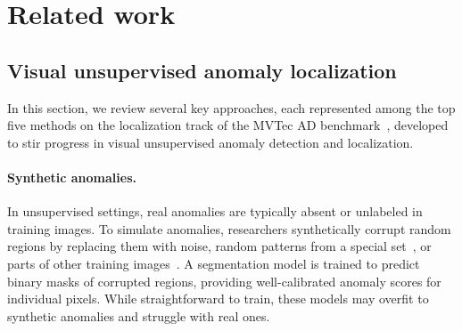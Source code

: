 
\section{Related work}
\label{sec:related_work}

\subsection{Visual unsupervised anomaly localization}

In this section, we review several key approaches, each represented among the top five methods on the localization track of the MVTec AD benchmark~\cite{mvtec}, developed to stir progress in visual unsupervised anomaly detection and localization. 

\paragraph{Synthetic anomalies.} In unsupervised settings, real anomalies are typically absent or unlabeled in training images. To simulate anomalies, researchers synthetically corrupt random regions by replacing them with noise, random patterns from a special set~\cite{memseg}, or parts of other training images~\cite{mood_top1}. A segmentation model is trained to predict binary masks of corrupted regions, providing well-calibrated anomaly scores for individual pixels. While straightforward to train, these models may overfit to synthetic anomalies and struggle with real ones.

